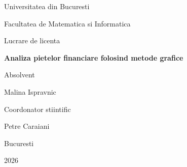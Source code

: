 \begin{titlepage}

\begin{center}

Universitatea din Bucuresti

Facultatea de Matematica si Informatica

\vspace{2cm}

Lucrare de licenta

\vspace{2cm}

{\Huge \bfseries Analiza pietelor financiare folosind metode grafice\par}

\vspace{2cm}

Absolvent

Malina Ispravnic

\vspace{1cm}

Coordonator stiintific

Petre Caraiani

\vspace{2cm}

Bucuresti

2026

\end{center}

\end{titlepage}